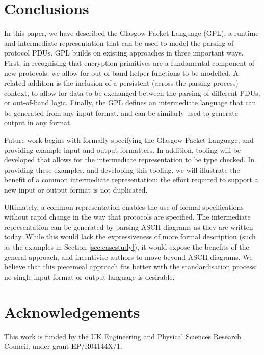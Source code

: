\documentclass[10pt,sigconf]{acmart}
\begin{document}
\section{Conclusions}
\label{sec:conclusion}

In this paper, we have described the Glasgow Packet Language (GPL), a runtime and
intermediate representation that can be used to model the parsing of protocol PDUs. GPL
builds on existing approaches in three important ways. First, in recognising that
encryption primitives are a fundamental component of new protocols, we allow for
out-of-band helper functions to be modelled. A related addition is the inclusion of a
persistent (across the parsing process) context, to allow for data to be exchanged between
the parsing of different PDUs, or out-of-band logic. Finally, the GPL defines an
intermediate language that can be generated from any input format, and can be similarly
used to generate output in any format.

Future work begins with formally specifying the Glasgow Packet Language, and providing
example input and output formatters. In addition, tooling will be developed that allows
for the intermediate representation to be type checked. In providing these examples, and
developing this tooling, we will illustrate the benefit of a common intermediate
representation: the effort required to support a new input or output format is not
duplicated.

Ultimately, a common representation enables the use of formal specifications without rapid
change in the way that protocols are specified. The intermediate representation can be
generated by parsing ASCII diagrams as they are written today. While this would lack the
expressiveness of more formal description (such as the examples in Section
\ref{sec:casestudy}), it would expose the benefits of the general approach, and
incentivise authors to move beyond ASCII diagrams. We believe that this piecemeal approach
fits better with the standardisation process: no single input format or output language is
desirable.

\section{Acknowledgements}

This work is funded by the UK Engineering and Physical Sciences Research Council, under
grant EP/R04144X/1.
\end{document}
